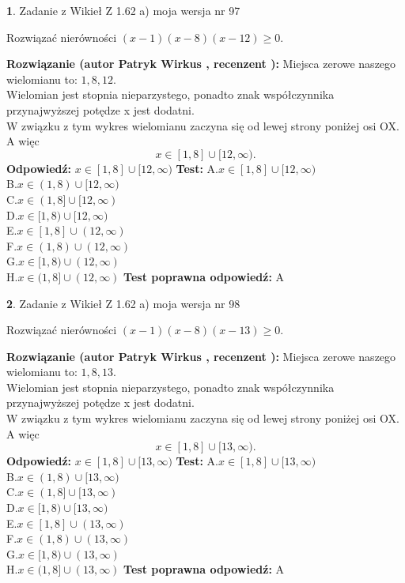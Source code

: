 \documentclass[12pt, a4paper]{article}
\theoremstyle{definition} %
\newtheorem{zad}{}
\newcommand{\zadStart}[1]{\begin{zad}#1\newline}
\newcommand{\zadStop}{\end{zad}}
\newcommand{\rozwStart}[2]{\noindent \textbf{Rozwiązanie (autor #1 , recenzent #2): }\newline}
\newcommand{\rozwStop}{\newline}
\newcommand{\odpStart}{\noindent \textbf{Odpowiedź:}\newline}
\newcommand{\odpStop}{\newline}
\newcommand{\testStart}{\noindent \textbf{Test:}\newline}
\newcommand{\testStop}{\newline}
\newcommand{\kluczStart}{\noindent \textbf{Test poprawna odpowiedź:}\newline}
\newcommand{\kluczStop}{\newline}
\begin{document}
\zadStart{Zadanie z Wikieł Z 1.62 a) moja wersja nr 97}

Rozwiązać nierówności $(x-1)(x-8)(x-12)\ge0$.
\zadStop
\rozwStart{Patryk Wirkus}{}
Miejsca zerowe naszego wielomianu to: $1, 8, 12$.\\
Wielomian jest stopnia nieparzystego, ponadto znak współczynnika przy\linebreak najwyższej potędze x jest dodatni.\\ W związku z tym wykres wielomianu zaczyna się od lewej strony poniżej osi OX. A więc $$x \in [1,8] \cup [12,\infty).$$
\rozwStop
\odpStart
$x \in [1,8] \cup [12,\infty)$
\odpStop
\testStart
A.$x \in [1,8] \cup [12,\infty)$\\
B.$x \in (1,8) \cup [12,\infty)$\\
C.$x \in (1,8] \cup [12,\infty)$\\
D.$x \in [1,8) \cup [12,\infty)$\\
E.$x \in [1,8] \cup (12,\infty)$\\
F.$x \in (1,8) \cup (12,\infty)$\\
G.$x \in [1,8) \cup (12,\infty)$\\
H.$x \in (1,8] \cup (12,\infty)$
\testStop
\kluczStart
A
\kluczStop



\zadStart{Zadanie z Wikieł Z 1.62 a) moja wersja nr 98}

Rozwiązać nierówności $(x-1)(x-8)(x-13)\ge0$.
\zadStop
\rozwStart{Patryk Wirkus}{}
Miejsca zerowe naszego wielomianu to: $1, 8, 13$.\\
Wielomian jest stopnia nieparzystego, ponadto znak współczynnika przy\linebreak najwyższej potędze x jest dodatni.\\ W związku z tym wykres wielomianu zaczyna się od lewej strony poniżej osi OX. A więc $$x \in [1,8] \cup [13,\infty).$$
\rozwStop
\odpStart
$x \in [1,8] \cup [13,\infty)$
\odpStop
\testStart
A.$x \in [1,8] \cup [13,\infty)$\\
B.$x \in (1,8) \cup [13,\infty)$\\
C.$x \in (1,8] \cup [13,\infty)$\\
D.$x \in [1,8) \cup [13,\infty)$\\
E.$x \in [1,8] \cup (13,\infty)$\\
F.$x \in (1,8) \cup (13,\infty)$\\
G.$x \in [1,8) \cup (13,\infty)$\\
H.$x \in (1,8] \cup (13,\infty)$
\testStop
\kluczStart
A
\kluczStop
\end{document}

